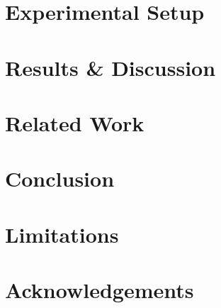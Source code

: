 \documentclass[11pt]{article}
\begin{document}
\section{Experimental Setup}

\section{Results \& Discussion}
\label{sec:results_and_discussion}

\section{Related Work}


\section{Conclusion} %


\section*{Limitations}


\section*{Acknowledgements}




\appendix









\end{document}
